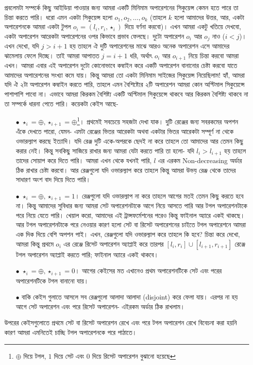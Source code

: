 \begin{solution}
প্রবলেমটা সম্পর্কে কিছু আইডিয়া পাওয়ার জন্য আমরা একটি মিনিমাম অপারেশনের সিকুয়েন্স কেমন হতে পারে তা চিন্তা করতে পারি। ধরো এমন একটা সিকুয়েন্স হলো $o_1, o_2, \ldots, o_k$ (তাহলে $k$ হলো আমাদের উত্তর, আর, একটা অপারেশনকে আমরা একটা টুপল $o_i = (l_i, r_i, \star_i)$ দিয়ে বর্ণনা করবো)।  এখন আমরা একটু খতিয়ে দেখবো, একটা অপারেশন আরেকটা অপারেশনের ওপর কিভাবে প্রভাব ফেলছে। দুটো অপারেশন $o_i$ আর $o_j$ নাও ($i < j$)। এখন দেখো, যদি $j > i+1$ হয় তাহলে ঐ দুটি অপারেশনের মাঝে আরও অনেক অপারেশন এসে আমাদের ঝামেলায় ফেলে দিচ্ছে। তাই আমরা আপাতত $j=i+1$ ধরি, অর্থাৎ $o_i$ আর $o_{i+1}$ নিয়ে চিন্তা করবো আমরা এখন। আমরা এবার এই অপারেশন দুটো কোনোভাবে কম্বাইন করে একটি অপারেশন বানানোর চেষ্টা করবো যাতে আমাদের অপারেশনের সংখ্যা কমে যায়। কিন্তু আমরা তো একটা মিনিমাম সাইজের সিকুয়েন্স নিয়েছিলাম! হ্যাঁ, আমরা যদি ঐ ২টা অপারেশন কম্বাইন করতে পারি, তাহলে এমন বৈশিষ্ট্যের ২টি অপারেশন আমরা কোন অপ্টিমাল সিকুয়েন্সে  পাশাপাশি পাবো না। এভাবে আমরা কিরকম বৈশিষ্ট্য একটি অপ্টিমাল সিকুয়েন্সে থাকবে আর কিরকম বৈশিষ্ট্য থাকবে না তা সম্পর্কে ধারনা পেতে পারি। কয়েকটা কেইস আছে-
\begin{itemize}
  \item[$\bullet$] $\star_i = \oplus, \star_{i+1} = \oplus$\footnote{$\oplus$ দিয়ে টগল, $1$ দিয়ে সেট এবং $0$ দিয়ে রিসেট অপারেশন বুঝানো হয়েছে}। প্রথমেই সবচেয়ে সহজটা দেখা যাক। দুটি রেঞ্জের জন্য সবরকমের অপশন এঁকে দেখতে পারো, যেমন- এমটা রেঞ্জের ভিতর আরেকটা অথবা একটার ভিতর আরেকটা সম্পূর্ণ না থেকে ওভারল্যাপ করছে ইত্যাদি। যদি রেঞ্জ দুটি একে-অপরকে  ছেদই না করে তাহলে তো আমাদের আর তেমন কিছু করার নেই। কিন্তু সবকিছু সাজিয়ে রাখার জন্য আমরা যেটা করতে পারি তা হলো- যদি $l_i > l_{i+1}$ হয় তাহলে তাদের সোয়াপ করে দিতে পারি। আমরা এখন থেকে যখনই পারি, $l$ এর এরকম Non-decreasing অর্ডার ঠিক রাখার চেষ্টা করবো। আর রেঞ্জগুলো যদি ওভারল্যাপ করে তাহলে কিন্তু আমরা উভয় রেঞ্জ থেকে তাদের সাধারণ অংশ বাদ দিয়ে দিতে পারি।
  \item[$\bullet$] $\star_i = \oplus, \star_{i+1} = 1$।  রেঞ্জগুলো যদি ওভারল্যাপ না করে তাহলে আগের মতই তেমন কিছু করতে হবে না। কিন্তু আমাদের সুবিধার জন্য আমরা সেট অপারেশনটাকে আগে নিয়ে আসতে পারি আর টগল অপারেশনটাকে পরে নিয়ে যেতে পারি। খেয়াল করো, আমাদের এই ট্রান্সফর্মেশনের পরেও কিন্তু ফাইনাল অ্যারে একই থাকছে। আর টগল অপারেশনটাকে পরে নেওয়ার কারণ হলো সেট বা রিসেট অপারেশনের চাইতে টগল অপারেশনে আমরা এক দিক দিয়ে বেশি অপশন পাই। এখন, রেঞ্জগুলো যদি ওভারল্যাপ করে তাহলে কি হবে? চিন্তা করে দেখো, আমরা কিন্তু প্রথমে $o_i$ এর রেঞ্জে রিসেট অপারেশন অ্যাপ্লাই করে তারপর $[l_i, r_i] \cup [l_{i+1}, r_{i+1}]$ রেঞ্জে টগল অপারেশন অ্যাপ্লাই করতে পারি; ফাইনাল অ্যারে একই থাকবে।
  \item[$\bullet$] $\star_i = \oplus, \star_{i+1} = 0$। আগের কেইসের মত এখানেও প্রথম অপারেশনটিকে সেট এবং পরের অপারেশনটিকে টগল বানানো যায়।
  \item[$\bullet$] বাকি কেইস গুলাতে আসলে সব রেঞ্জগুলো আলাদা আলাদা (disjoint) করে ফেলা যায়। এরপর না হয় আগে সেট অপারেশন এবং পরে রিসেট অপারেশন- এইরকম অর্ডার ঠিক রাখলাম।
\end{itemize}
উপরের কেইসগুলোতে প্রথমে সেট বা রিসেট অপারেশন রেখে এবং পরে টগল অপারেশন রেখে বিবেচনা করা হয়নি কারণ আমরা এমনিতেই চাচ্ছি টগল অপারেশনকে পরে পাঠাতে।


\end{solution}
